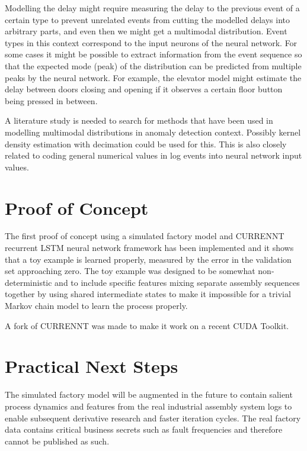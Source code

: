 \documentclass[a4paper,10pt]{article}
\begin{document}
Modelling the delay might require measuring the delay to the previous event of a certain type to prevent unrelated events from cutting the modelled delays into arbitrary parts,
and even then we might get a multimodal distribution. Event types in this context correspond to the input neurons of the neural network.
For some cases it might be possible to extract information from the event sequence so that
the expected mode (peak) of the distribution can be predicted from multiple peaks by the neural network. For example,
the elevator model might estimate the delay between doors closing and opening if it observes a certain floor button being pressed in between.

A literature study is needed to search for methods that have been used in modelling multimodal distributions in anomaly detection context. Possibly kernel density estimation
with decimation could be used for this. This is also closely related to coding general numerical values in log events into neural network input values.

\section{Proof of Concept}

The first proof of concept using a simulated factory model and CURRENNT\cite{CURRENNT} recurrent LSTM neural network framework
has been implemented and it shows that a toy example\cite{PoC}
is learned properly, measured by the error in the validation set approaching zero. The toy example was designed to be somewhat non-deterministic and to include specific
features mixing separate assembly sequences together by using shared intermediate states to make it impossible for a trivial Markov chain model to learn the process properly.

A fork of CURRENNT was made to make it work on a recent CUDA Toolkit\cite{CURRENNTFORK}.

\section{Practical Next Steps}

The simulated factory model will be augmented in the future to contain salient process dynamics and features from the real industrial assembly system logs to enable subsequent
derivative research and faster iteration cycles. The real factory data contains critical business secrets such as fault frequencies and therefore cannot be published as such.
\end{document}

